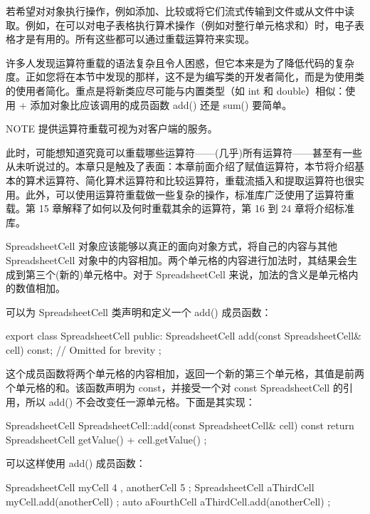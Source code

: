 
若希望对对象执行操作，例如添加、比较或将它们流式传输到文件或从文件中读取。例如，在可以对电子表格执行算术操作（例如对整行单元格求和）时，电子表格才是有用的。所有这些都可以通过重载运算符来实现。

许多人发现运算符重载的语法复杂且令人困惑，但它本来是为了降低代码的复杂度。正如您将在本节中发现的那样，这不是为编写类的开发者简化，而是为使用类的使用者简化。重点是将新类应尽可能与内置类型（如 int 和 double）相似：使用 + 添加对象比应该调用的成员函数 add() 还是 sum() 要简单。

\begin{myNotic}{NOTE}
提供运算符重载可视为对客户端的服务。
\end{myNotic}

此时，可能想知道究竟可以重载哪些运算符——(几乎)所有运算符——甚至有一些从未听说过的。本章只是触及了表面：本章前面介绍了赋值运算符，本节将介绍基本的算术运算符、简化算术运算符和比较运算符，重载流插入和提取运算符也很实用。此外，可以使用运算符重载做一些复杂的操作，标准库广泛使用了运算符重载。第 15 章解释了如何以及何时重载其余的运算符，第 16 到 24 章将介绍标准库。


SpreadsheetCell 对象应该能够以真正的面向对象方式，将自己的内容与其他 SpreadsheetCell 对象中的内容相加。两个单元格的内容进行加法时，其结果会生成到第三个(新的)单元格中。对于 SpreadsheetCell 来说，加法的含义是单元格内的数值相加。


可以为 SpreadsheetCell 类声明和定义一个 add() 成员函数：

\begin{cpp}
export class SpreadsheetCell
{
    public:
        SpreadsheetCell add(const SpreadsheetCell& cell) const;
        // Omitted for brevity
};
\end{cpp}

这个成员函数将两个单元格的内容相加，返回一个新的第三个单元格，其值是前两个单元格的和。该函数声明为 const，并接受一个对 const SpreadsheetCell 的引用，所以 add() 不会改变任一源单元格。下面是其实现：

\begin{cpp}
SpreadsheetCell SpreadsheetCell::add(const SpreadsheetCell& cell) const
{
    return SpreadsheetCell { getValue() + cell.getValue() };
}
\end{cpp}

可以这样使用 add() 成员函数：

\begin{cpp}
SpreadsheetCell myCell { 4 }, anotherCell { 5 };
SpreadsheetCell aThirdCell { myCell.add(anotherCell) };
auto aFourthCell { aThirdCell.add(anotherCell) };
\end{cpp}

